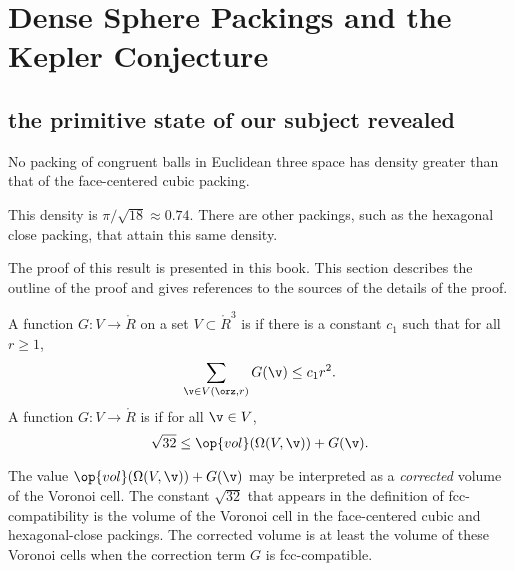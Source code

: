 \section{Dense Sphere Packings and the Kepler Conjecture}

\subsection{the primitive state of our subject revealed}


\begin{theorem}
\label{theorem:kepler}   No packing of congruent balls in
Euclidean three space has density greater than that of the
face-centered cubic packing.
\end{theorem}

\begin{remark}
This density is $\pi/\sqrt{18}\approx 0.74.$  There are other
packings, such as the hexagonal close packing, that attain this
same density.
\end{remark}

The proof of this result is presented in this book. This section
describes the outline of the proof and gives references to
the sources of the details of the proof.



\begin{definition}\label{def:negligible}
A function $G:V\to \ring{R}$ on a set $V\subset\ring{R}^3$
is 
if there is a constant $c_1$ such that for all $r\ge1$,
\begin{displaymath}\sum_{\v\in V(\orz,r)} G(\v) \le c_1
r^2.\end{displaymath}
A function $G: V\to\ring{R}$ is
if for all $\v\in V$, 
\begin{displaymath}\sqrt{32}\le \op{vol}(\Omega(V,\v)) +
G(\v).\end{displaymath}
%
%
%
\end{definition}


\begin{remark}
The value $\op{vol}(\Omega(V,\v)) + G(\v)$ may be interpreted as a
{\it corrected\/} volume of the Voronoi cell. The constant
$\sqrt{32}$ that appears in the definition of fcc-compatibility is
the volume of the Voronoi cell in the face-centered cubic and
hexagonal-close packings.  The corrected volume is at least the
volume of these Voronoi cells when the correction term $G$ is
fcc-compatible.  %
\end{remark}

